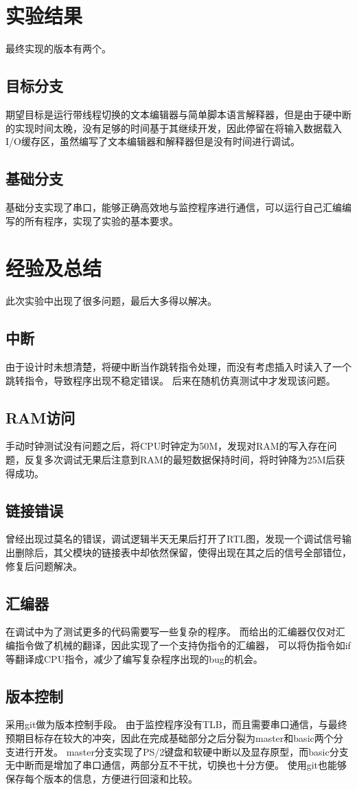 \section{实验结果}
  最终实现的版本有两个。
  \subsection{目标分支}
    期望目标是运行带线程切换的文本编辑器与简单脚本语言解释器，但是由于硬中断的实现时间太晚，没有足够的时间基于其继续开发，因此停留在将输入数据载入I/O缓存区，虽然编写了文本编辑器和解释器但是没有时间进行调试。
  \subsection{基础分支}
    基础分支实现了串口，能够正确高效地与监控程序进行通信，可以运行自己汇编编写的所有程序，实现了实验的基本要求。

\section{经验及总结}
  此次实验中出现了很多问题，最后大多得以解决。
  \subsection{中断}
    由于设计时未想清楚，将硬中断当作跳转指令处理，而没有考虑插入时读入了一个跳转指令，导致程序出现不稳定错误。
    后来在随机仿真测试中才发现该问题。
  \subsection{RAM访问}
    手动时钟测试没有问题之后，将CPU时钟定为50M，发现对RAM的写入存在问题，反复多次调试无果后注意到RAM的最短数据保持时间，将时钟降为25M后获得成功。
  \subsection{链接错误}
    曾经出现过莫名的错误，调试逻辑半天无果后打开了RTL图，发现一个调试信号输出删除后，其父模块的链接表中却依然保留，使得出现在其之后的信号全部错位，修复后问题解决。
  \subsection{汇编器}
    在调试中为了测试更多的代码需要写一些复杂的程序。
    而给出的汇编器仅仅对汇编指令做了机械的翻译，因此实现了一个支持伪指令的汇编器，
    可以将伪指令如if等翻译成CPU指令，减少了编写复杂程序出现的bug的机会。
  \subsection{版本控制}
    采用git做为版本控制手段。
    由于监控程序没有TLB，而且需要串口通信，与最终预期目标存在较大的冲突，因此在完成基础部分之后分裂为master和basic两个分支进行开发。
    master分支实现了PS/2键盘和软硬中断以及显存原型，而basic分支无中断而是增加了串口通信，两部分互不干扰，切换也十分方便。
    使用git也能够保存每个版本的信息，方便进行回滚和比较。


